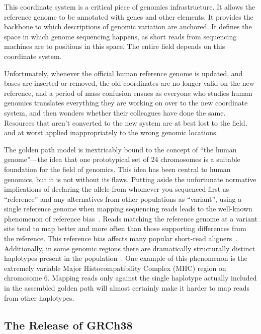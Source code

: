 This coordinate system is a critical piece of genomics infrastructure. It allows the reference genome to be annotated with genes and other elements. It provides the backbone to which descriptions of genomic variation are anchored. It defines the space in which genome sequencing happens, as short reads from sequencing machines are  to positions in this space. The entire field depends on this coordinate system.

Unfortunately, whenever the official human reference genome is updated, and bases are inserted or removed, the old coordinates are no longer valid on the new reference, and a period of mass confusion ensues as everyone who studies human genomics translates everything they are working on over to the new coordinate system, and then wonders whether their colleagues have done the same. Resources that aren't converted to the new system are at best lost to the field, and at worst applied inappropriately to the wrong genomic locations.

The golden path model is inextricably bound to the concept of ``the human genome''---the idea that one prototypical set of 24 chromosomes is a suitable foundation for the field of genomics. This idea has been central to human genomics, but it is not without its flaws. Putting aside the unfortunate normative implications of declaring the allele from whomever you sequenced first as ``reference'' and any alternatives from other populations as ``variant'', using a single reference genome when mapping sequencing reads leads to the well-known phenomenon of reference bias~\cite{degner2009effect,brandt2015mapping}. Reads matching the reference genome at a variant site tend to map better and more often than those supporting differences from the reference. This reference bias affects many popular short-read aligners~\cite{lunter2011stampy}. Additionally, in some genomic regions there are dramatically structurally distinct haplotypes present in the population~\cite{church2011modernizing}. One example of this phenomenon is the extremely variable Major Histocompatibility Complex (MHC) region on chromosome 6. Mapping reads only against the single haplotype actually included in the assembled golden path will almost certainly make it harder to map reads from other haplotypes.


\subsection{The Release of GRCh38}

